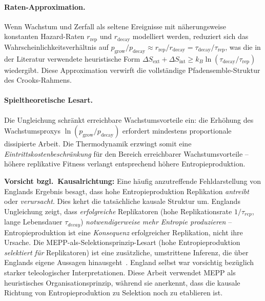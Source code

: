\documentclass[12pt,a4paper]{article}
\theoremstyle{remark}
\begin{document}
\paragraph{Raten-Approximation.} Wenn Wachstum und Zerfall als seltene Ereignisse mit näherungsweise konstanten Hazard-Raten $r_{\mathrm{rep}}$ und $r_{\mathrm{decay}}$ modelliert werden, reduziert sich das Wahrscheinlichkeitsverhältnis auf $p_{\mathrm{grow}} / p_{\mathrm{decay}} \approx r_{\mathrm{rep}} / r_{\mathrm{decay}} = \tau_{\mathrm{decay}} / \tau_{\mathrm{rep}}$, was die in der Literatur verwendete heuristische Form $\Delta S_{\mathrm{ext}} + \Delta S_{\mathrm{int}} \geq k_B \ln(\tau_{\mathrm{decay}} / \tau_{\mathrm{rep}})$ wiedergibt. Diese Approximation verwirft die vollständige Pfadensemble-Struktur des Crooks-Rahmens.

\paragraph{Spieltheoretische Lesart.} Die Ungleichung schränkt erreichbare Wachstumsvorteile ein: die Erhöhung des Wachstumsproxys $\ln(p_{\mathrm{grow}} / p_{\mathrm{decay}})$ erfordert mindestens proportionale dissipierte Arbeit. Die Thermodynamik erzwingt somit eine \emph{Eintrittskostenbeschränkung} für den Bereich erreichbarer Wachstumsvorteile -- höhere replikative Fitness verlangt entsprechend höhere Entropieproduktion.

\textbf{Vorsicht bzgl.\ Kausalrichtung:} Eine häufig anzutreffende Fehldarstellung von Englands Ergebnis besagt, dass hohe Entropieproduktion Replikation \emph{antreibt} oder \emph{verursacht}. Dies kehrt die tatsächliche kausale Struktur um. Englands Ungleichung zeigt, dass \emph{erfolgreiche} Replikatoren (hohe Replikationsrate $1/\tau_{rep}$, lange Lebensdauer $\tau_{decay}$) \emph{notwendigerweise mehr Entropie produzieren} -- Entropieproduktion ist eine \emph{Konsequenz} erfolgreicher Replikation, nicht ihre Ursache. Die MEPP-als-Selektionsprinzip-Lesart (hohe Entropieproduktion \emph{selektiert für} Replikatoren) ist eine zusätzliche, umstrittene Inferenz, die über Englands eigene Aussagen hinausgeht~\citep{England2013}. England selbst war vorsichtig bezüglich starker teleologischer Interpretationen. Diese Arbeit verwendet MEPP als heuristisches Organisationsprinzip, während sie anerkennt, dass die kausale Richtung von Entropieproduktion zu Selektion noch zu etablieren ist.
\end{document}
